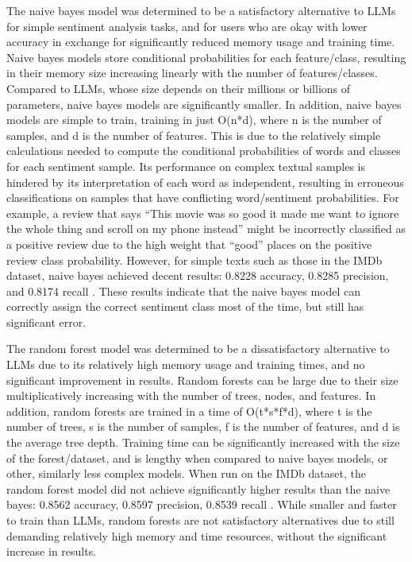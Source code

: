 \documentclass[10pt,twocolumn,letterpaper]{article}
\begin{document}
The naive bayes model was determined to be a satisfactory alternative to LLMs for simple sentiment analysis tasks, and for users who are okay with lower accuracy in exchange for significantly reduced memory usage and training time. Naive bayes models store conditional probabilities for each feature/class, resulting in their memory size increasing linearly with the number of features/classes. Compared to LLMs, whose size depends on their millions or billions of parameters, naive bayes models are significantly smaller. In addition, naive bayes models are simple to train, training in just O(n*d), where n is the number of samples, and d is the number of features. This is due to the relatively simple calculations needed to compute the conditional probabilities of words and classes for each sentiment sample. Its performance on complex textual samples is hindered by its interpretation of each word as independent, resulting in erroneous classifications on samples that have conflicting word/sentiment probabilities. For example, a review that says “This movie was so good it made me want to ignore the whole thing and scroll on my phone instead” might be incorrectly classified as a positive review due to the high weight that “good” places on the positive review class probability. However, for simple texts such as those in the IMDb dataset, naive bayes achieved decent results: 0.8228 accuracy, 0.8285 precision, and 0.8174  recall \cite{MLTechniques}. These results indicate that the naive bayes model can correctly assign the correct sentiment class most of the time, but still has significant error. 

The random forest model was determined to be a dissatisfactory alternative to LLMs due to its relatively high memory usage and training times, and no significant improvement in results. Random forests can be large due to their size multiplicatively increasing with the number of trees, nodes, and features. In addition, random forests are trained in a time of O(t*s*f*d), where t is the number of trees, s is the number of samples, f is the number of features, and d is the average tree depth. Training time can be significantly increased with the size of the forest/dataset, and is lengthy when compared to naive bayes models, or other, similarly less complex models. When run on the IMDb dataset, the random forest model did not achieve significantly higher results than the naive bayes: 0.8562 accuracy, 0.8597 precision, 0.8539 recall \cite{MLTechniques}. While smaller and faster to train than LLMs, random forests are not satisfactory alternatives due to still demanding relatively high memory and time resources, without the significant increase in results.
\end{document}
